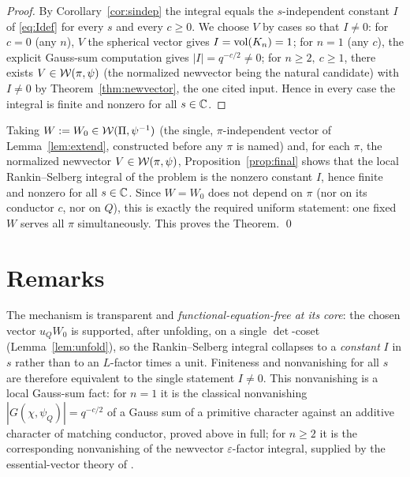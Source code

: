 \begin{proof}
By Corollary~\ref{cor:sindep} the integral equals the $s$-independent constant $I$ of
\eqref{eq:Idef} for every $s$ and every $c\ge0$. We choose $V$ by cases so that $I\ne0$: for
$c=0$ \textup{(}any $n$\textup{)}, $V$ the spherical vector gives $I=\operatorname{vol}(K_n)=1$; for $n=1$
\textup{(}any $c$\textup{)}, the explicit Gauss-sum computation gives $|I|=q^{-c/2}\ne0$; for
$n\ge2,\ c\ge1$, there exists $V\in\mathcal{W}(\pi,\psi)$ \textup{(}the normalized newvector being the
natural candidate\textup{)} with $I\ne0$ by Theorem~\ref{thm:newvector}, the one cited input. Hence
in every case the integral is finite and nonzero for all $s\in\mathbb{C}$.
\end{proof}

Taking $W:=W_0\in\mathcal{W}(\Pi,\psi^{-1})$ \textup{(}the single, $\pi$-independent vector of
Lemma~\ref{lem:extend}, constructed before any $\pi$ is named\textup{)} and, for each $\pi$, the
normalized newvector $V\in\mathcal{W}(\pi,\psi)$, Proposition~\ref{prop:final} shows that the local
Rankin--Selberg integral of the problem is the nonzero constant $I$, hence finite and nonzero for
all $s\in\mathbb{C}$. Since $W=W_0$ does not depend on $\pi$ \textup{(}nor on its conductor $c$, nor on
$Q$\textup{)}, this is exactly the required uniform statement: one fixed $W$ serves all $\pi$
simultaneously. This proves the Theorem. \qed

\section*{Remarks}

The mechanism is transparent and \emph{functional-equation-free at its core}: the chosen vector
$u_Q W_0$ is supported, after unfolding, on a single $\det$-coset
\textup{(}Lemma~\ref{lem:unfold}\textup{)}, so the Rankin--Selberg integral collapses to a
\emph{constant} $I$ in $s$ rather than to an $L$-factor times a unit. Finiteness and nonvanishing
for all $s$ are therefore equivalent to the single statement $I\neq0$. This nonvanishing is a
local Gauss-sum fact: for $n=1$ it is the classical nonvanishing $|G(\chi,\psi_Q)|=q^{-c/2}$ of a
Gauss sum of a primitive character against an additive character of matching conductor, proved
above in full; for $n\ge2$ it is the corresponding nonvanishing of the newvector
$\varepsilon$-factor integral, supplied by the essential-vector theory of \cite{JPSS81,Matringe}.


